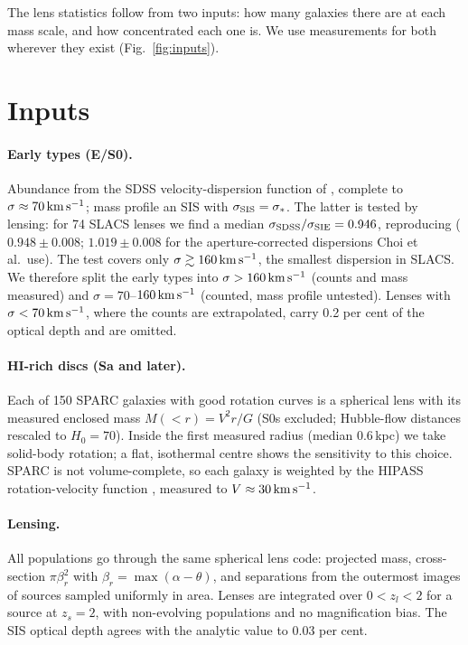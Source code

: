 \documentclass[11pt,a4paper]{article}
\newcommand{\kms}{\,{\rm km\,s^{-1}}}
\begin{document}
The lens statistics follow from two inputs: how many galaxies there are at each mass scale, and how concentrated each one is. We use measurements for both wherever they exist (Fig.~\ref{fig:inputs}).

\section{Inputs}

\paragraph{Early types (E/S0).} Abundance from the SDSS velocity-dispersion function of \citet{Choi2007}, complete to $\sigma\approx70\kms$; mass profile an SIS with $\sigma_{\rm SIS}=\sigma_*$. The latter is tested by lensing: for 74 SLACS lenses \citep{Auger2009} we find a median $\sigma_{\rm SDSS}/\sigma_{\rm SIE}=0.946$, reproducing \citet{Bolton2008} ($0.948\pm0.008$; $1.019\pm0.008$ for the aperture-corrected dispersions Choi et al.\ use). The test covers only $\sigma\gtrsim160\kms$, the smallest dispersion in SLACS. We therefore split the early types into $\sigma>160\kms$ (counts and mass measured) and $\sigma=70$--$160\kms$ (counted, mass profile untested). Lenses with $\sigma<70\kms$, where the counts are extrapolated, carry 0.2 per cent of the optical depth and are omitted.

\paragraph{HI-rich discs (Sa and later).} Each of 150 SPARC galaxies \citep{Lelli2016} with good rotation curves is a spherical lens with its measured enclosed mass $M(<r)=V^2r/G$ (S0s excluded; Hubble-flow distances rescaled to $H_0=70$). Inside the first measured radius (median 0.6\,kpc) we take solid-body rotation; a flat, isothermal centre shows the sensitivity to this choice. SPARC is not volume-complete, so each galaxy is weighted by the HIPASS rotation-velocity function \citep{Zwaan2010}, measured to $V\approx30\kms$.

\paragraph{Lensing.} All populations go through the same spherical lens code: projected mass, cross-section $\pi\beta_r^2$ with $\beta_r=\max(\alpha-\theta)$, and separations from the outermost images of sources sampled uniformly in area. Lenses are integrated over $0<z_l<2$ for a source at $z_s=2$, with non-evolving populations and no magnification bias. The SIS optical depth agrees with the analytic value to 0.03 per cent.
\end{document}
